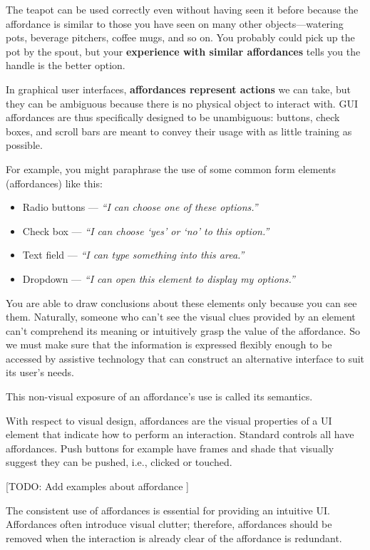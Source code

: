 The teapot can be used correctly even without having seen it before because the affordance is similar to those you have seen on many other objects---watering pots, beverage pitchers, coffee mugs, and so on. You probably could pick up the pot by the spout, but your \textbf{experience with similar affordances} tells you the handle is the better option.

In graphical user interfaces, \textbf{affordances represent actions} we can take, but they can be ambiguous because there is no physical object to interact with. GUI affordances are thus specifically designed to be unambiguous: buttons, check boxes, and scroll bars are meant to convey their usage with as little training as possible.

For example, you might paraphrase the use of some common form elements (affordances) like this:
\begin{itemize}
	\item Radio buttons --- \emph{``I can choose one of these options.''}
	\item Check box --- \emph{``I can choose `yes' or `no' to this option.''}
	\item Text field --- \emph{``I can type something into this area.''}
	\item Dropdown --- \emph{``I can open this element to display my options.''}
\end{itemize}

You are able to draw conclusions about these elements only because you can see them. Naturally, someone who can't see the visual clues provided by an element can't comprehend its meaning or intuitively grasp the value of the affordance. So we must make sure that the information is expressed flexibly enough to be accessed by assistive technology that can construct an alternative interface to suit its user's needs.

This non-visual exposure of an affordance's use is called its semantics.

With respect to visual design, affordances are the visual properties of a UI element that indicate how to perform an interaction. 
Standard controls all have affordances.
Push buttons for example have frames and shade that visually suggest they can be pushed, i.e., clicked or touched. 

[TODO: Add examples about affordance ]

The consistent use of affordances is essential for providing an intuitive UI. Affordances often introduce visual clutter; therefore, affordances should be removed when the interaction is already clear of the affordance is redundant. 

